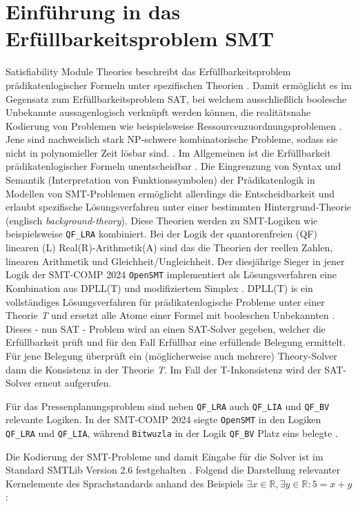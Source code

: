 \section{Einführung in das Erfüllbarkeitsproblem SMT}
Satisfiability Module Theories beschreibt das Erfüllbarkeitsproblem prädikatenlogischer Formeln unter spezifischen Theorien \cite{smt}.
Damit ermöglicht es im Gegensatz zum Erfüllbarkeitsproblem SAT, bei welchem ausschließlich boolesche Unbekannte aussagenlogisch verknüpft werden können,
die realitätsnahe Kodierung von Problemen wie beispielsweise Ressourcenzuordnungsproblemen \cite{rcpsp}.
Jene sind nachweislich stark NP-schwere kombinatorische Probleme, sodass sie nicht in polynomieller Zeit lösbar sind. \cite{rcpspnp}.
Im Allgemeinen ist die Erfüllbarkeit prädikatenlogischer Formeln unentscheidbar \cite{smt}.
Die Eingrenzung von Syntax und Semantik (Interpretation von Funktionssymbolen) der Prädikatenlogik in Modellen von SMT-Problemen
ermöglicht allerdings die Entscheidbarkeit und erlaubt spezifische Lösungsverfahren unter einer bestimmten Hintergrund-Theorie (englisch \textit{background-theory}).
Diese Theorien werden zu SMT-Logiken wie beispielsweise \texttt{QF\_LRA} kombiniert.
Bei der Logik der quantorenfreien (QF) linearen (L) Real(R)-Arithmetik(A) sind das die Theorien der reellen Zahlen, linearen Arithmetik und Gleichheit/Ungleichheit.
Der diesjährige Sieger in jener Logik der SMT-COMP 2024 \texttt{OpenSMT} \cite{smtcomp2024results} implementiert als Lösungsverfahren eine Kombination aus DPLL(T) und modifiziertem Simplex \cite{opensmt}.
DPLL(T) is ein vollständiges Lösungsverfahren für prädikatenlogische Probleme unter einer Theorie \textit{T} und ersetzt alle Atome einer Formel mit booleschen Unbekannten \cite{smt}.
Dieses - nun SAT - Problem wird an einen SAT-Solver gegeben, welcher die Erfüllbarkeit prüft und für den Fall Erfüllbar eine erfüllende Belegung ermittelt.
Für jene Belegung überprüft ein (möglicherweise auch mehrere) Theory-Solver dann die Konsistenz in der Theorie \textit{T}.
Im Fall der T-Inkonsistenz wird der SAT-Solver erneut aufgerufen.

Für das Pressenplanungsproblem sind neben \texttt{QF\_LRA} auch \texttt{QF\_LIA} und \texttt{QF\_BV} relevante Logiken.
In der SMT-COMP 2024 siegte \texttt{OpenSMT} in den Logiken \texttt{QF\_LRA} und \texttt{QF\_LIA}, während \texttt{Bitwuzla} in der Logik \texttt{QF\_BV} Platz eins belegte \cite{smtcomp2024results}.

Die Kodierung der SMT-Probleme und damit Eingabe für die Solver ist im Standard SMTLib Version 2.6 festgehalten \cite{smtlib}.
Folgend die Darstellung relevanter Kernelemente des Sprachstandards anhand des Beispiels
$\exists x \in \mathbb{R}, \exists y \in \mathbb{R}: 5 = x + y$:

